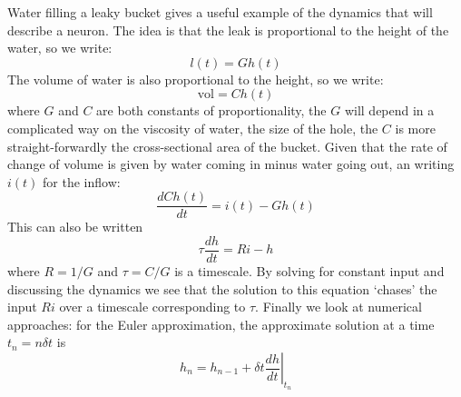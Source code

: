\documentclass[12pt]{article}
\begin{document}
Water filling a leaky bucket gives a useful example of the dynamics that will describe a neuron. The idea is that the leak is proportional to the height of the water, so we write:
\begin{equation}
  l(t)=Gh(t)
\end{equation}
The volume of water is also proportional to the height, so we write:
\begin{equation}
  \text{vol}=Ch(t)
\end{equation}
where $G$ and $C$ are both constants of proportionality, the $G$ will
depend in a complicated way on the viscosity of water, the size of the
hole, the $C$ is more straight-forwardly the cross-sectional area of
the bucket. Given that the rate of change of volume is given by water
coming in minus water going out, an writing $i(t)$ for the inflow:
\begin{equation}
\frac{dCh(t)}{dt}=i(t)-Gh(t)
\end{equation}
This can also be written
\begin{equation}
\tau\frac{dh}{dt}=Ri-h
\end{equation}
where $R=1/G$ and $\tau=C/G$ is a timescale. By solving for constant
input and discussing the dynamics we see that the solution to this
equation `chases' the input $Ri$ over a timescale corresponding to
$\tau$. Finally we look at numerical approaches: for the Euler
approximation, the approximate solution at a time $t_n=n\delta t$ is
\begin{equation}
  h_n=h_{n-1}+\delta t \left.\frac{dh}{dt}\right|_{t_n}
\end{equation}
\end{document}
